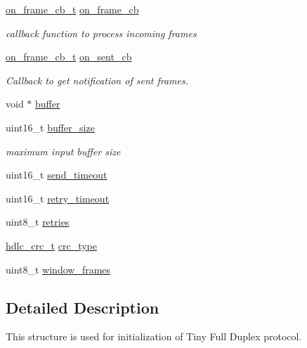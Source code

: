 \begin{DoxyCompactItemize}
\hyperlink{tiny__types_8h_ad6bf709565b8aecb9e6ecf196f219d54}{on\+\_\+frame\+\_\+cb\+\_\+t} \hyperlink{structtiny__fd__init__t___a437d94ac2f58ea83f510e0a35733f3a1}{on\+\_\+frame\+\_\+cb}
\begin{DoxyCompactList}\small\item\em callback function to process incoming frames \end{DoxyCompactList}\item 
\mbox{\label{structtiny__fd__init__t___ab256903ac157e22647dc37d4aee6a986}} 
\hyperlink{tiny__types_8h_ad6bf709565b8aecb9e6ecf196f219d54}{on\+\_\+frame\+\_\+cb\+\_\+t} \hyperlink{structtiny__fd__init__t___ab256903ac157e22647dc37d4aee6a986}{on\+\_\+sent\+\_\+cb}
\begin{DoxyCompactList}\small\item\em Callback to get notification of sent frames. \end{DoxyCompactList}\item 
void $\ast$ \hyperlink{structtiny__fd__init__t___a9a82b8c6c060dbc17022a0c902d436f2}{buffer}
\item 
\mbox{\label{structtiny__fd__init__t___af76a7f851dc110e5c3f506f66ae91320}} 
uint16\+\_\+t \hyperlink{structtiny__fd__init__t___af76a7f851dc110e5c3f506f66ae91320}{buffer\+\_\+size}
\begin{DoxyCompactList}\small\item\em maximum input buffer size \end{DoxyCompactList}\item 
uint16\+\_\+t \hyperlink{structtiny__fd__init__t___ae6653af324c07711c4b20360760c3e3a}{send\+\_\+timeout}
\item 
uint16\+\_\+t \hyperlink{structtiny__fd__init__t___a54b9c689fba5aae8ccc0c29f05a159ca}{retry\+\_\+timeout}
\item 
uint8\+\_\+t \hyperlink{structtiny__fd__init__t___ae366ae6e7626b0d92a6e5088c29169cd}{retries}
\item 
\hyperlink{group__HDLC__API_gabb73b32d08d8e79eefe9385634a74bf7}{hdlc\+\_\+crc\+\_\+t} \hyperlink{structtiny__fd__init__t___ac69d819ccec020c8382eee492070a85a}{crc\+\_\+type}
\item 
uint8\+\_\+t \hyperlink{structtiny__fd__init__t___ae4da012c3e39c4e7dda587191b4c2f77}{window\+\_\+frames}
\end{DoxyCompactItemize}


\subsection{Detailed Description}
This structure is used for initialization of Tiny Full Duplex protocol. 

